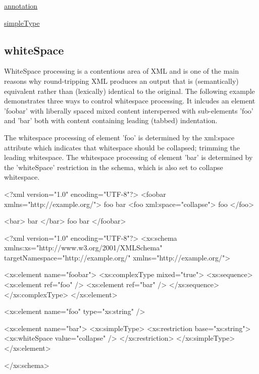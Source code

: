 \begin{DoxyItemize}
\item \hyperlink{annotation}{annotation}
\item \hyperlink{simpletype}{simpleType} 
\end{DoxyItemize}\hypertarget{whiteSpace}{}\subsection{whiteSpace}\label{whiteSpace}
WhiteSpace processing is a contentious area of XML and is one of the main reasons why round-\/tripping XML produces an output that is (semantically) equivalent rather than (lexically) identical to the original. The following example demonstrates three ways to control whitespace processing. It inlcudes an element 'foobar' with liberally spaced mixed content interspersed with sub-\/elements 'foo' and 'bar' both with content containing leading (tabbed) indentation.

The whitespace processing of element 'foo' is determined by the xml:space attribute which indicates that whitespace should be collapsed; trimming the leading whitespace. The whitespace processing of element 'bar' is determined by the 'whiteSpace' restriction in the schema, which is also set to collapse whitespace.


\begin{DoxyCodeInclude}
<?xml version="1.0" encoding="UTF-8"?>
<foobar xmlns="http://example.org/">
        foo
        bar
        <foo xml:space="collapse">
        foo
        </foo>
        
        <bar>
        bar
        </bar>
        foo             bar
</foobar>
\end{DoxyCodeInclude}
 
\begin{DoxyCodeInclude}
<?xml version="1.0" encoding="UTF-8"?>
<xs:schema xmlns:xs="http://www.w3.org/2001/XMLSchema" 
        targetNamespace="http://example.org/" xmlns="http://example.org/">

        <xs:element name="foobar">
        <xs:complexType mixed="true">
                <xs:sequence>
                        <xs:element ref="foo" />
                        <xs:element ref="bar" />
                </xs:sequence>
        </xs:complexType>
        </xs:element>
        
        <xs:element name="foo" type="xs:string" />
        
        <xs:element name="bar">
                <xs:simpleType>
                        <xs:restriction base="xs:string">
                                <xs:whiteSpace value="collapse" />
                        </xs:restriction>
                </xs:simpleType>
        </xs:element>
        
</xs:schema>
\end{DoxyCodeInclude}


